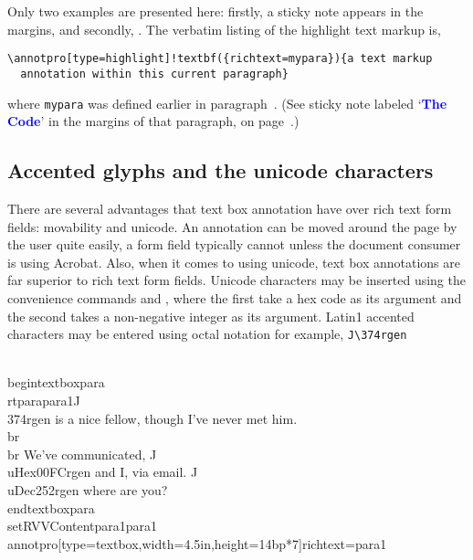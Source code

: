 \documentclass[12pt]{article}
\makeatletter
\let\app\textsf
\let\amtIndent\leftmargini
\edef\amtIndent{\the\parindent}
\renewenvironment{quote}[1][]
   {\def\@rgi{#1}\ifx\@rgi\@empty
    \let\rghtm\@empty\else\def\rghtm{\rightmargin\leftmargin}\fi
    \list{}{\rghtm} %
    \item\relax}
   {\endlist}
\makeatother
\begin{document}
Only two examples are presented here: firstly, a sticky note appears in the margins, and
secondly, .
The verbatim listing of the highlight text markup is,
\begin{Verbatim}[xleftmargin=\amtIndent,fontsize=\small,commandchars=!()]
\annotpro[type=highlight]!textbf({richtext=mypara}){a text markup
  annotation within this current paragraph}
\end{Verbatim}
where \texttt{mypara} was defined earlier in
paragraph~. (See sticky note labeled
`\textcolor{blue}{\textbf{The Code}}' in the margins of that paragraph, on
page~\pageref{exmpl:rt}.)

\subsection{Accented glyphs and the unicode characters}

There are several advantages that text box annotation have over rich text
form fields: movability and unicode. An annotation can be moved around the
page by the user quite easily, a form field typically cannot unless the
document consumer is using \app{Acrobat}. Also, when it comes to using
unicode, text box annotations are far superior to rich text form fields.
Unicode characters may be inserted using the convenience commands
 and
, where the first take a hex code as its
argument and the second takes a non-negative integer as its argument. Latin1
accented characters may be entered using octal notation for example,
\verb~J\374rgen~
\begin{defineJS}{\annotextboxi}
\\begin{textboxpara}
\\rtpara{para1}{J\\374rgen is a nice fellow, though I've never met him.\\br\\br
We've communicated, J\\uHex{00FC}rgen and I, via email. J\\uDec{252}rgen where are you?}
\\end{textboxpara}
\\setRVVContent{para1}{para1}
\\annotpro[type=textbox,width=4.5in,height=14bp*7]{richtext=para1}
\end{defineJS}
\begin{textboxpara}
\end{textboxpara}
\begin{quote}
%
\annotpro[margin,readonly,margintext={\centering The Code}]{\annotextboxi}%
\end{quote}
\end{document}
